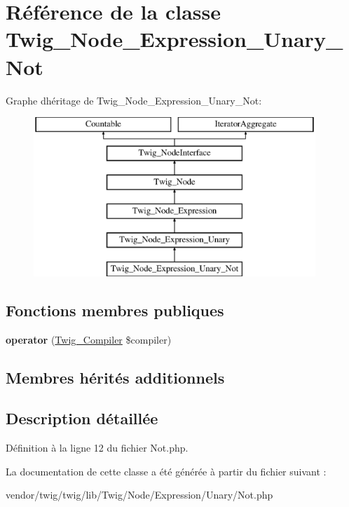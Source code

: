 \hypertarget{class_twig___node___expression___unary___not}{}\section{Référence de la classe Twig\+\_\+\+Node\+\_\+\+Expression\+\_\+\+Unary\+\_\+\+Not}
\label{class_twig___node___expression___unary___not}
Graphe d\textquotesingle{}héritage de Twig\+\_\+\+Node\+\_\+\+Expression\+\_\+\+Unary\+\_\+\+Not\+:\begin{figure}[H]
\begin{center}
\leavevmode
\includegraphics[height=6.000000cm]{class_twig___node___expression___unary___not}
\end{center}
\end{figure}
\subsection*{Fonctions membres publiques}
\begin{DoxyCompactItemize}
\item 
{\bfseries operator} (\hyperlink{class_twig___compiler}{Twig\+\_\+\+Compiler} \$compiler)\hypertarget{class_twig___node___expression___unary___not_af77318ec88d5f8a508684970a150b670}{}\label{class_twig___node___expression___unary___not_af77318ec88d5f8a508684970a150b670}

\end{DoxyCompactItemize}
\subsection*{Membres hérités additionnels}


\subsection{Description détaillée}


Définition à la ligne 12 du fichier Not.\+php.



La documentation de cette classe a été générée à partir du fichier suivant \+:\begin{DoxyCompactItemize}
\item 
vendor/twig/twig/lib/\+Twig/\+Node/\+Expression/\+Unary/Not.\+php\end{DoxyCompactItemize}
